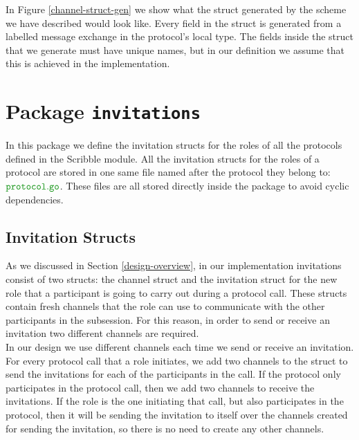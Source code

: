 \documentclass[12pt,twoside]{report}
\begin{document}
In Figure \ref{channel-struct-gen} we show what the struct generated by the scheme we have described would look like. Every field in the struct is generated from a labelled message exchange in the protocol's local type. The fields inside the struct that we generate must have unique names, but in our definition we assume that this is achieved in the implementation.

\section{Package \texttt{invitations}}\label{pkg-invitations}
In this package we define the invitation structs for the roles of all the protocols defined in the Scribble module. All the invitation structs for the roles of a protocol are stored in one same file named after the protocol they belong to: $\filename{protocol}$. These files are all stored directly inside the package to avoid cyclic dependencies.

\subsection{Invitation Structs}

As we discussed in Section \ref{design-overview}, in our implementation invitations consist of two structs: the channel struct and the invitation struct for the new role that a participant is going to carry out during a protocol call. These structs contain fresh channels that the role can use to communicate with the other participants in the subsession. For this reason, in order to send or receive an invitation two different channels are required.\\

In our design we use different channels each time we send or receive an invitation. For every protocol call that a role initiates, we add two channels to the struct to send the invitations for each of the participants in the call. If the protocol only participates in the protocol call, then we add two channels to receive the invitations. If the role is the one initiating that call, but also participates in the protocol, then it will be sending the invitation to itself over the channels created for sending the invitation, so there is no need to create any other channels.\\
\end{document}
